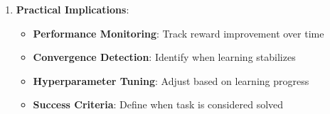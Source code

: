 \begin{itemize}
\begin{enumerate}
        \item \textbf{Practical Implications}:
        \begin{itemize}
            \item \textbf{Performance Monitoring}: Track reward improvement over time
            \item \textbf{Convergence Detection}: Identify when learning stabilizes
            \item \textbf{Hyperparameter Tuning}: Adjust based on learning progress
            \item \textbf{Success Criteria}: Define when task is considered solved
        \end{itemize}
    \end{enumerate}
\end{itemize}